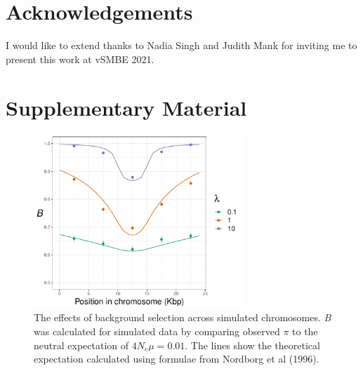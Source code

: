 \documentclass[10pt,twoside, twocolumn]{GSA_format}
\newcommand{\beginsupplement}{%
        \setcounter{table}{0}
        \renewcommand{\thetable}{S\arabic{table}}%
        \setcounter{figure}{0}
        \renewcommand{\thefigure}{S\arabic{figure}}%
     }
\begin{document}
\section{Acknowledgements}

I would like to extend thanks to Nadia Singh and Judith Mank for inviting me to present this work at vSMBE 2021.

\beginsupplement

\onecolumn 

\section{Supplementary Material}

\begin{figure}[h]
\includegraphics[width=0.7\textwidth]{../TheoreticalExpectation/B_fixed_plot}
\caption{The effects of background selection across simulated chromosomes. \textit{B} was calculated for simulated data by comparing observed $\pi$ to the neutral expectation of $4N_e\mu=0.01$. The lines show the theoretical expectation calculated using formulae from Nordborg et al (1996).}
\label{fig:BGS_fixed_plot}
\end{figure}
\end{document}
